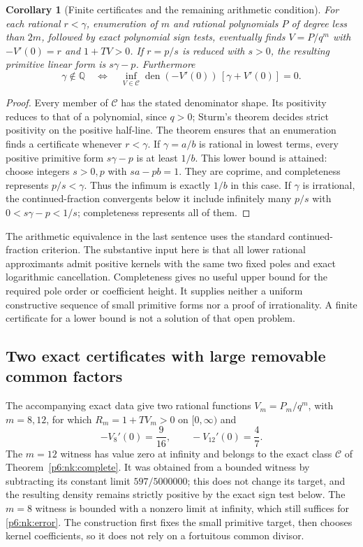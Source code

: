 \documentclass[11pt,a4paper]{article}
\newtheorem{corollary}[theorem]{Corollary}
\theoremstyle{definition}
\theoremstyle{remark}
\numberwithin{equation}{section}
\begin{document}
\begin{corollary}[Finite certificates and the remaining arithmetic condition]
\label{p6:nk:arithmetic}
For each rational $r<\gamma$, enumeration of $m$ and rational polynomials
$P$ of degree less than $2m$, followed by exact polynomial sign tests,
eventually finds $V=P/q^m$ with $-V'(0)=r$ and $1+TV>0$.
If $r=p/s$ is reduced with $s>0$, the resulting primitive linear form is
$s\gamma-p$. Furthermore
\[
 \gamma\notin\mathbb Q
 \quad\Longleftrightarrow\quad
 \inf_{V\in\mathcal C}
       \operatorname{den}(-V'(0))\,[\gamma+V'(0)]=0.
\]
\end{corollary}
\begin{proof}
Every member of $\mathcal C$ has the stated denominator shape. Its
positivity reduces to that of a polynomial, since $q>0$; Sturm's theorem
decides strict positivity on the positive half-line. The theorem ensures
that an enumeration finds a certificate whenever $r<\gamma$.
If $\gamma=a/b$ is rational in lowest terms, every positive primitive
form $s\gamma-p$ is at least $1/b$. This lower bound is attained: choose
integers $s>0,p$ with $sa-pb=1$. They are coprime, and completeness
represents $p/s<\gamma$. Thus the infimum is exactly $1/b$ in this case. If $\gamma$ is irrational, the
continued-fraction convergents below it include infinitely many
$p/s$ with $0<s\gamma-p<1/s$; completeness represents all of them.
\end{proof}
The arithmetic equivalence in the last sentence uses the standard
continued-fraction criterion. The substantive input here is that all
lower rational approximants admit positive kernels with the same two
fixed poles and exact logarithmic cancellation. Completeness gives no
useful upper bound for the required pole order or coefficient height.
It supplies neither a uniform constructive sequence of small primitive
forms nor a proof of irrationality. A finite certificate for a lower
bound is not a solution of that open problem.

\subsection{Two exact certificates with large removable common factors}
The accompanying exact data give two rational functions
$V_m=P_m/q^m$, with $m=8,12$, for which $R_m=1+TV_m>0$ on
$[0,\infty)$ and
\[
 -V_8'(0)=\frac9{16},\qquad -V_{12}'(0)=\frac47.
\]
The $m=12$ witness has value zero at infinity and belongs to the exact
class $\mathcal C$ of Theorem~\ref{p6:nk:complete}. It was obtained from a
bounded witness by subtracting its constant limit $597/5000000$; this
does not change its target, and the resulting density remains strictly
positive by the exact sign test below. The $m=8$ witness is bounded with
a nonzero limit at infinity, which still suffices for \eqref{p6:nk:error}.
The construction first fixes the small primitive target, then chooses
kernel coefficients, so it does not rely on a fortuitous common divisor.
\end{document}
